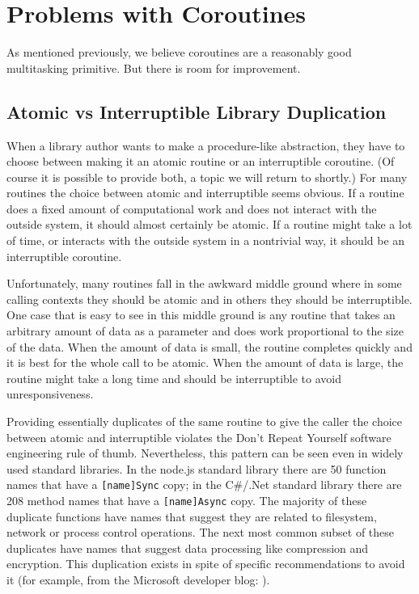 \documentclass[a4paper,UKenglish,cleveref, autoref]{lipics-v2019}
\begin{document}
\section{Problems with Coroutines}

As mentioned previously, we believe coroutines are a reasonably good multitasking primitive.
But there is room for improvement.

\subsection{Atomic vs Interruptible Library Duplication}

When a library author wants to make a procedure-like abstraction, they have to choose between making it an atomic routine or an interruptible coroutine.
(Of course it is possible to provide both, a topic we will return to shortly.)
For many routines the choice between atomic and interruptible seems obvious.
If a routine does a fixed amount of computational work and does not interact with the outside system, it should almost certainly be atomic.
If a routine might take a lot of time, or interacts with the outside system in a nontrivial way, it should be an interruptible coroutine.

Unfortunately, many routines fall in the awkward middle ground where in some calling contexts they should be atomic and in others they should be interruptible.
One case that is easy to see in this middle ground is any routine that takes an arbitrary amount of data as a parameter and does work proportional to the size of the data.
When the amount of data is small, the routine completes quickly and it is best for the whole call to be atomic.
When the amount of data is large, the routine might take a long time and should be interruptible to avoid unresponsiveness.

Providing essentially duplicates of the same routine to give the caller the choice between atomic and interruptible violates the Don't Repeat Yourself software engineering rule of thumb.
Nevertheless, this pattern can be seen even in widely used standard libraries.
In the node.js standard library there are 50 function names that have a \texttt{[name]Sync} copy; in the C\#{\slash}.Net standard library there are 208 method names that have a \texttt{[name]Async} copy.
The majority of these duplicate functions have names that suggest they are related to filesystem, network or process control operations.
The next most common subset of these duplicates have names that suggest data processing like compression and encryption.
This duplication exists in spite of specific recommendations to avoid it (for example, from the Microsoft developer blog: \cite{Toub2012, Toub2012a}).
\end{document}
